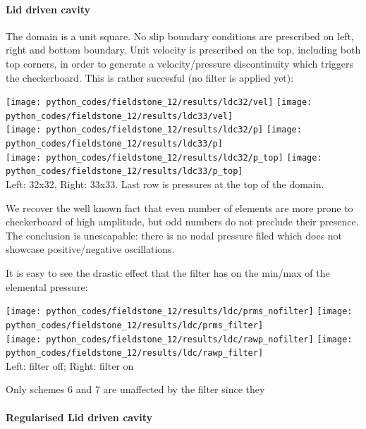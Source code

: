 \newpage
\paragraph{Lid driven cavity}

The domain is a unit square. No slip boundary conditions are prescribed 
on left, right and bottom boundary. Unit velocity is prescribed on the top, 
including both top corners, in order to generate a velocity/pressure discontinuity  
which triggers the checkerboard. This is rather succesful (no filter is applied yet):

\begin{center}
\texttt{[image: python\_codes/fieldstone\_12/results/ldc32/vel]}
\texttt{[image: python\_codes/fieldstone\_12/results/ldc33/vel]}\\
\texttt{[image: python\_codes/fieldstone\_12/results/ldc32/p]}
\texttt{[image: python\_codes/fieldstone\_12/results/ldc33/p]}\\
\texttt{[image: python\_codes/fieldstone\_12/results/ldc32/p\_top]}
\texttt{[image: python\_codes/fieldstone\_12/results/ldc33/p\_top]}\\
{\captionfont Left: 32x32, Right: 33x33. Last row is pressures at the top of the domain.}
\end{center}

We recover the well known fact that even number of elements are more prone to 
checkerboard of high amplitude, but odd numbers do not preclude their presence.
The conclusion is unescapable: there is no nodal pressure filed which does not 
showcase positive/negative oscillations.


It is easy to see the drastic effect that the filter has on the min/max of the elemental pressure:

\begin{center}
\texttt{[image: python\_codes/fieldstone\_12/results/ldc/prms\_nofilter]}
\texttt{[image: python\_codes/fieldstone\_12/results/ldc/prms\_filter]}\\
\texttt{[image: python\_codes/fieldstone\_12/results/ldc/rawp\_nofilter]}
\texttt{[image: python\_codes/fieldstone\_12/results/ldc/rawp\_filter]}\\
{\captionfont Left: filter off; Right: filter on}
\end{center}

Only schemes 6 and 7 are unaffected by the filter since they 


\paragraph{Regularised Lid driven cavity}

